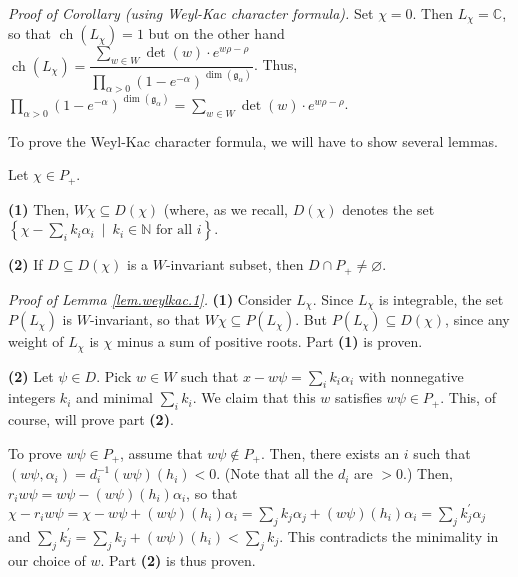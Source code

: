 \documentclass[etingof-lie.tex]{subfiles}
\begin{document}
\textit{Proof of Corollary (using Weyl-Kac character formula).} Set $\chi=0$.
Then $L_{\chi}=\mathbb{C}$, so that $\operatorname*{ch}\left(  L_{\chi
}\right)  =1$ but on the other hand $\operatorname*{ch}\left(  L_{\chi
}\right)  =\dfrac{\sum\limits_{w\in W}\det\left(  w\right)  \cdot
e^{w\rho-\rho}}{\prod\limits_{\alpha>0}\left(  1-e^{-\alpha}\right)
^{\dim\left(  \mathfrak{g}_{\alpha}\right)  }}$. Thus, $\prod\limits_{\alpha
>0}\left(  1-e^{-\alpha}\right)  ^{\dim\left(  \mathfrak{g}_{\alpha}\right)
}=\sum\limits_{w\in W}\det\left(  w\right)  \cdot e^{w\rho-\rho}$.

To prove the Weyl-Kac character formula, we will have to show several lemmas.

\begin{lemma}
\label{lem.weylkac.1}Let $\chi\in P_{+}$.

\textbf{(1)} Then, $W\chi\subseteq D\left(  \chi\right)  $ (where, as we
recall, $D\left(  \chi\right)  $ denotes the set $\left\{  \chi-\sum_{i}%
k_{i}\alpha_{i}\ \mid\ k_{i}\in\mathbb{N}\text{ for all }i\right\}  $.

\textbf{(2)} If $D\subseteq D\left(  \chi\right)  $ is a $W$-invariant subset,
then $D\cap P_{+}\neq\varnothing$.
\end{lemma}

\textit{Proof of Lemma \ref{lem.weylkac.1}.} \textbf{(1)} Consider $L_{\chi}$.
Since $L_{\chi}$ is integrable, the set $P\left(  L_{\chi}\right)  $ is
$W$-invariant, so that $W\chi\subseteq P\left(  L_{\chi}\right)  $. But
$P\left(  L_{\chi}\right)  \subseteq D\left(  \chi\right)  $, since any weight
of $L_{\chi}$ is $\chi$ minus a sum of positive roots. Part \textbf{(1)} is proven.

\textbf{(2)} Let $\psi\in D$. Pick $w\in W$ such that $x-w\psi=\sum_{i}%
k_{i}\alpha_{i}$ with nonnegative integers $k_{i}$ and minimal $\sum_{i}k_{i}%
$. We claim that this $w$ satisfies $w\psi\in P_{+}$. This, of course, will
prove part \textbf{(2)}.

To prove $w\psi\in P_{+}$, assume that $w\psi\notin P_{+}$. Then, there exists
an $i$ such that $\left(  w\psi,\alpha_{i}\right)  =d_{i}^{-1}\left(
w\psi\right)  \left(  h_{i}\right)  <0$. (Note that all the $d_{i}$ are $>0$.)
Then, $r_{i}w\psi=w\psi-\left(  w\psi\right)  \left(  h_{i}\right)  \alpha
_{i}$, so that $\chi-r_{i}w\psi=\chi-w\psi+\left(  w\psi\right)  \left(
h_{i}\right)  \alpha_{i}=\sum_{j}k_{j}\alpha_{j}+\left(  w\psi\right)  \left(
h_{i}\right)  \alpha_{i}=\sum_{j}k_{j}^{\prime}\alpha_{j}$ and $\sum_{j}%
k_{j}^{\prime}=\sum_{j}k_{j}+\left(  w\psi\right)  \left(  h_{i}\right)
<\sum_{j}k_{j}$. This contradicts the minimality in our choice of $w$. Part
\textbf{(2)} is thus proven.
\end{document}
